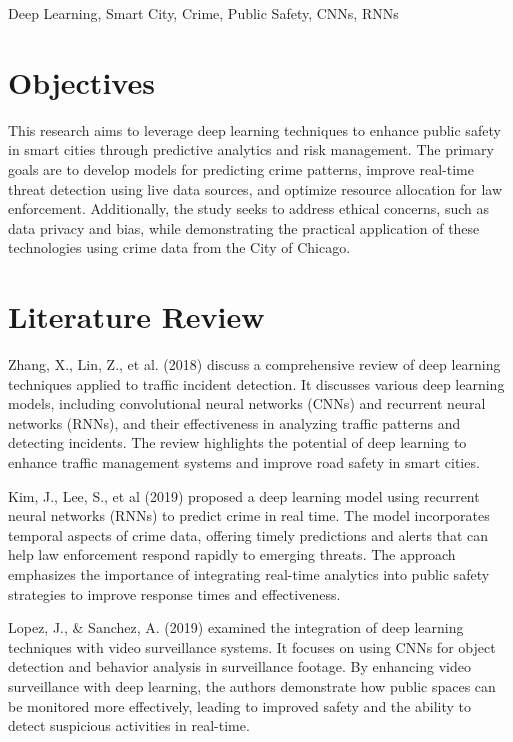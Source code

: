 \documentclass[conference]{IEEEtran}
\begin{document}
 \begin{IEEEkeywords}Deep Learning, Smart City, Crime, Public Safety, CNNs, RNNs

 \end{IEEEkeywords}
\section{Objectives}This research aims to leverage deep learning techniques to enhance public safety in smart cities through predictive analytics and risk management. The primary goals are to develop models for predicting crime patterns, improve real-time threat detection using live data sources, and optimize resource allocation for law enforcement. Additionally, the study seeks to address ethical concerns, such as data privacy and bias, while demonstrating the practical application of these technologies using crime data from the City of Chicago.


\section{Literature Review}\cite{b1} Zhang, X., Lin, Z., et al. (2018) discuss a comprehensive review of deep learning techniques applied to traffic incident detection. It discusses various deep learning models, including convolutional neural networks (CNNs) and recurrent neural networks (RNNs), and their effectiveness in analyzing traffic patterns and detecting incidents. The review highlights the potential of deep learning to enhance traffic management systems and improve road safety in smart cities. 

\cite{b2}  Kim, J., Lee, S., et al (2019) proposed a deep learning model using recurrent neural networks (RNNs) to predict crime in real time. The model incorporates temporal aspects of crime data, offering timely predictions and alerts that can help law enforcement respond rapidly to emerging threats. The approach emphasizes the importance of integrating real-time analytics into public safety strategies to improve response times and effectiveness. 

\cite{b3} Lopez, J., & Sanchez, A. (2019) examined the integration of deep learning techniques with video surveillance systems. It focuses on using CNNs for object detection and behavior analysis in surveillance footage. By enhancing video surveillance with deep learning, the authors demonstrate how public spaces can be monitored more effectively, leading to improved safety and the ability to detect suspicious activities in real-time.
\end{document}
